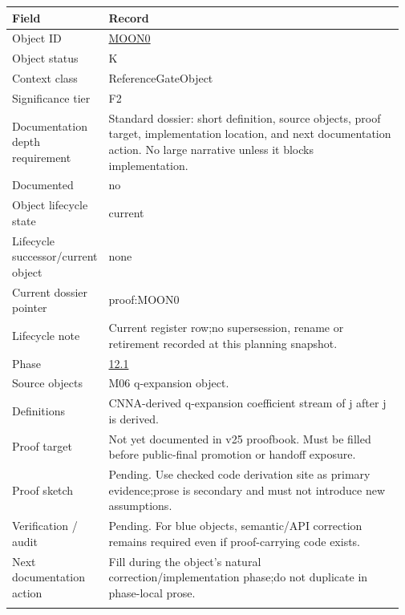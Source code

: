 \begin{longtable}{L{0.16\linewidth} L{0.81\linewidth}}
\hline
\textbf{Field} & \textbf{Record}\\
\hline
Object ID & \hyperlink{object-row-MOON0}{MOON0}\\
\hline\addlinespace[0.20em]
Object status & K\\
\hline\addlinespace[0.20em]
Context class & ReferenceGateObject\\
\hline\addlinespace[0.20em]
Significance tier & F2\\
\hline\addlinespace[0.20em]
Documentation depth requirement & Standard dossier: short definition, source objects, proof target, implementation location, and next documentation action. No large narrative unless it blocks implementation.\\
\hline\addlinespace[0.20em]
Documented & no\\
\hline\addlinespace[0.20em]
Object lifecycle state & current\\
\hline\addlinespace[0.20em]
Lifecycle successor/\allowbreak{}current object & none\\
\hline\addlinespace[0.20em]
Current dossier pointer & proof:MOON0\\
\hline\addlinespace[0.20em]
Lifecycle note & Current register row;\newline no supersession, rename or retirement recorded at this planning snapshot.\\
\hline\addlinespace[0.20em]
Phase & \hyperlink{phase-row-12-1}{12.1}\\
\hline\addlinespace[0.20em]
Source objects & M06 q-expansion object.\\
\hline\addlinespace[0.20em]
Definitions & CNNA-derived q-expansion coefficient stream of j after j is derived.\\
\hline\addlinespace[0.20em]
Proof target & Not yet documented in v25 proofbook. Must be filled before public-final promotion or handoff exposure.\\
\hline\addlinespace[0.20em]
Proof sketch & Pending. Use checked code derivation site as primary evidence;\newline prose is secondary and must not introduce new assumptions.\\
\hline\addlinespace[0.20em]
Verification /\allowbreak{} audit & Pending. For blue objects, semantic/\allowbreak{}API correction remains required even if proof-carrying code exists.\\
\hline\addlinespace[0.20em]
Next documentation action & Fill during the object's natural correction/\allowbreak{}implementation phase;\newline do not duplicate in phase-local prose.\\
\hline\addlinespace[0.20em]
\end{longtable}
